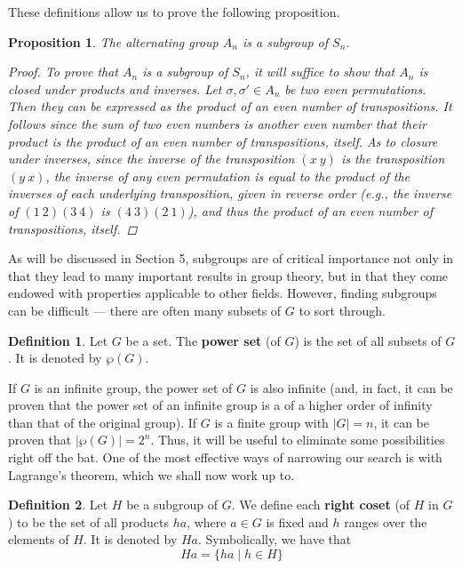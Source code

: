 \documentclass[openany, amssymb, psamsfonts]{amsart}
\newtheorem{prop}{Proposition}[section]
\theoremstyle{definition}
\newtheorem{defn}{Definition}[section]
\numberwithin{equation}{section}
\begin{document}
These definitions allow us to prove the following proposition.
\begin{prop}
    The alternating group $A_n$ is a subgroup of $S_n$.
    \begin{proof}
        To prove that $A_n$ is a subgroup of $S_n$, it will suffice to show that $A_n$ is closed under products and inverses. Let $\sigma,\sigma'\in A_n$ be two even permutations. Then they can be expressed as the product of an even number of transpositions. It follows since the sum of two even numbers is another even number that their product is the product of an even number of transpositions, itself. As to closure under inverses, since the inverse of the transposition $(x\ y)$ is the transposition $(y\ x)$, the inverse of any even permutation is equal to the product of the inverses of each underlying transposition, given in reverse order (e.g., the inverse of $(1\ 2)(3\ 4)$ is $(4\ 3)(2\ 1)$), and thus the product of an even number of transpositions, itself.
    \end{proof}
\end{prop}
As will be discussed in Section 5, subgroups are of critical importance not only in that they lead to many important results in group theory, but in that they come endowed with properties applicable to other fields. However, finding subgroups can be difficult --- there are often many subsets of $G$ to sort through.
\begin{defn}
    Let $G$ be a set. The \textbf{power set} (of $G$) is the set of all subsets of $G$. It is denoted by $\wp(G)$.
\end{defn}
If $G$ is an infinite group, the power set of $G$ is also infinite (and, in fact, it can be proven that the power set of an infinite group is a of a higher order of infinity than that of the original group). If $G$ is a finite group with $|G|=n$, it can be proven that $|\wp(G)|=2^n$. Thus, it will be useful to eliminate some possibilities right off the bat. One of the most effective ways of narrowing our search is with Lagrange's theorem, which we shall now work up to.\par
\begin{defn}
    Let $H$ be a subgroup of $G$. We define each \textbf{right coset} (of $H$ in $G$) to be the set of all products $ha$, where $a\in G$ is fixed and $h$ ranges over the elements of $H$. It is denoted by $Ha$. Symbolically, we have that
    \begin{equation*}
        Ha = \{ha\mid h\in H\}
    \end{equation*}
\end{defn}
\end{document}
